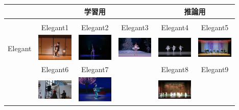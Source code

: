\begin{table}[t]
  \begin{center}
    \begin{tabular}{|c|ccc|cc|} \hline
        & \multicolumn{3}{|c|}{学習用} & \multicolumn{2}{|c|}{推論用} \\ \hline
        &&&&& \\
        & Elegant1\cite{jpn} & Elegant2\cite{china} & Elegant3\cite{ballet} & Elegant4\cite{balletgroup} & Elegant5\cite{jpngroup}
      \\
      Elegant
        & \includegraphics[width=17mm]{images/snaps/japanese_elegant.png}
        & \includegraphics[width=17mm]{images/snaps/chinese_elegant.png}
        & \includegraphics[width=17mm]{images/snaps/ballet_elegant.png}
        & \includegraphics[width=17mm]{images/snaps/ballet_group_elegant.png}
        & \includegraphics[width=17mm]{images/snaps/japanese_group_elegant.png}
      \\
      & Elegant6\cite{thai} & Elegant7\cite{jpn2} & & Elegant8\cite{chinagroup} & Elegant9\cite{belly}
      \\
        & \includegraphics[width=17mm]{images/snaps/thai_elegant.png}
        & \includegraphics[width=17mm]{images/snaps/japanese2_elegant.png}
        &
        & \includegraphics[width=17mm]{images/snaps/chinese_group_elegant.png}

\end{tabular}
\end{center}
\end{table}

